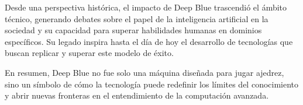 \documentclass[12pt,a4paper]{article}
\begin{document}
Desde una perspectiva histórica, el impacto de Deep Blue trascendió el ámbito técnico, generando debates sobre el papel de la inteligencia artificial en la sociedad y su capacidad para superar habilidades humanas en dominios específicos. Su legado inspira hasta el día de hoy el desarrollo de tecnologías que buscan replicar y superar este modelo de éxito.

En resumen, Deep Blue no fue solo una máquina diseñada para jugar ajedrez, sino un símbolo de cómo la tecnología puede redefinir los límites del conocimiento y abrir nuevas fronteras en el entendimiento de la computación avanzada.

\newpage


 
\end{document}
